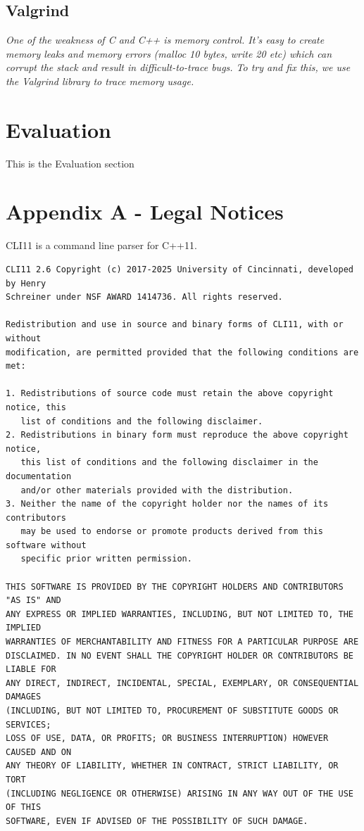 \documentclass[11pt]{article}
\begin{document}
\subsection{Valgrind}
\textit{One of the weakness of C and C++ is memory control. It's easy to create memory leaks and memory errors (malloc 10 bytes, write 20 etc) which can corrupt the stack and result in difficult-to-trace bugs.
To try and fix this, we use the Valgrind library to trace memory usage.}


\section{Evaluation}

This is the Evaluation section

\section{Appendix A - Legal Notices}

CLI11\cite{CLI11} is a command line parser for C++11.
\begin{verbatim}
CLI11 2.6 Copyright (c) 2017-2025 University of Cincinnati, developed by Henry
Schreiner under NSF AWARD 1414736. All rights reserved.

Redistribution and use in source and binary forms of CLI11, with or without
modification, are permitted provided that the following conditions are met:

1. Redistributions of source code must retain the above copyright notice, this
   list of conditions and the following disclaimer.
2. Redistributions in binary form must reproduce the above copyright notice,
   this list of conditions and the following disclaimer in the documentation
   and/or other materials provided with the distribution.
3. Neither the name of the copyright holder nor the names of its contributors
   may be used to endorse or promote products derived from this software without
   specific prior written permission.

THIS SOFTWARE IS PROVIDED BY THE COPYRIGHT HOLDERS AND CONTRIBUTORS "AS IS" AND
ANY EXPRESS OR IMPLIED WARRANTIES, INCLUDING, BUT NOT LIMITED TO, THE IMPLIED
WARRANTIES OF MERCHANTABILITY AND FITNESS FOR A PARTICULAR PURPOSE ARE
DISCLAIMED. IN NO EVENT SHALL THE COPYRIGHT HOLDER OR CONTRIBUTORS BE LIABLE FOR
ANY DIRECT, INDIRECT, INCIDENTAL, SPECIAL, EXEMPLARY, OR CONSEQUENTIAL DAMAGES
(INCLUDING, BUT NOT LIMITED TO, PROCUREMENT OF SUBSTITUTE GOODS OR SERVICES;
LOSS OF USE, DATA, OR PROFITS; OR BUSINESS INTERRUPTION) HOWEVER CAUSED AND ON
ANY THEORY OF LIABILITY, WHETHER IN CONTRACT, STRICT LIABILITY, OR TORT
(INCLUDING NEGLIGENCE OR OTHERWISE) ARISING IN ANY WAY OUT OF THE USE OF THIS
SOFTWARE, EVEN IF ADVISED OF THE POSSIBILITY OF SUCH DAMAGE.

\end{verbatim}


\printbibliography
\end{document}
